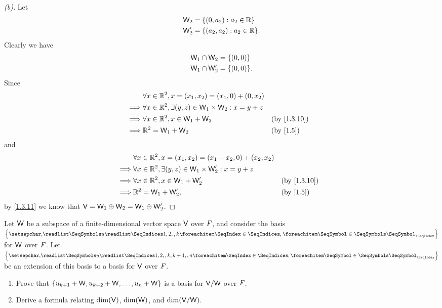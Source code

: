 \begin{proof}[(b)]
  Let
  \begin{align*}
    \W_2  & = \set{(0, a_2) : a_2 \in \R}    \\
    \W_2' & = \set{(a_2, a_2) : a_2 \in \R}.
  \end{align*}
  Clearly we have
  \begin{align*}
    \W_1 \cap \W_2  & = \set{(0, 0)}  \\
    \W_1 \cap \W_2' & = \set{(0, 0)}.
  \end{align*}
  Since
  \begin{align*}
             & \forall x \in \R^2, x = (x_1, x_2) = (x_1, 0) + (0, x_2)                                           \\
    \implies & \forall x \in \R^2, \exists (y, z) \in \W_1 \times \W_2 : x = y + z                                \\
    \implies & \forall x \in \R^2, x \in \W_1 + \W_2                               &  & \text{(by \cref{1.3.10})} \\
    \implies & \R^2 = \W_1 + \W_2                                                  &  & \text{(by \cref{1.5})}
  \end{align*}
  and
  \begin{align*}
             & \forall x \in \R^2, x = (x_1, x_2) = (x_1 - x_2, 0) + (x_2, x_2)                                    \\
    \implies & \forall x \in \R^2, \exists (y, z) \in \W_1 \times \W_2' : x = y + z                                \\
    \implies & \forall x \in \R^2, x \in \W_1 + \W_2'                               &  & \text{(by \cref{1.3.10})} \\
    \implies & \R^2 = \W_1 + \W_2',                                                 &  & \text{(by \cref{1.5})}
  \end{align*}
  by \cref{1.3.11} we know that \(\mathsf{V} = \mathsf{W}_1 \oplus \mathsf{W}_2 = \mathsf{W}_1 \oplus \mathsf{W}_2'\).
\end{proof}

\begin{ex}\label{ex:1.6.35}
  Let \(\mathsf{W}\) be a subspace of a finite-dimensional vector space \(\mathsf{V}\) over \(\mathit{F}\), and consider the basis \(\set{\seq{u}{1,2,,k}}\) for \(\mathsf{W}\) over \(\mathit{F}\).
  Let \(\set{\seq{u}{1,2,,k,k + 1,,n}}\) be an extension of this basis to a basis for \(\mathsf{V}\) over \(\mathit{F}\).
  \begin{enumerate}
    \item Prove that \(\left\lbrace u_{k + 1} + \mathsf{W}, u_{k + 2} + \mathsf{W}, \dots , u_n + \mathsf{W}\right\rbrace\) is a basis for \(\mathsf{V} / \mathsf{W}\) over \(\mathit{F}\).
    \item Derive a formula relating \(\dim(\mathsf{V})\), \(\dim(\mathsf{W})\), and \(\dim(\mathsf{V} / \mathsf{W})\).
  \end{enumerate}
\end{ex}

